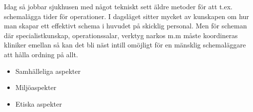 Idag så jobbar sjukhusen med något tekniskt sett äldre metoder för att t.ex. schemalägga tider för operationer. I dagsläget sitter mycket av kunskapen om hur man skapar ett effektivt schema i huvudet på skicklig personal. Men för scheman där specialistkunskap, operationssalar, verktyg narkos m.m måste koordineras kliniker emellan så kan det bli näst intill omöjligt för en mänsklig schemaläggare att hålla ordning på allt.

\begin{itemize}
\item Samhälleliga aspekter
\item Miljöaspekter
\item Etiska aspekter
\end{itemize}